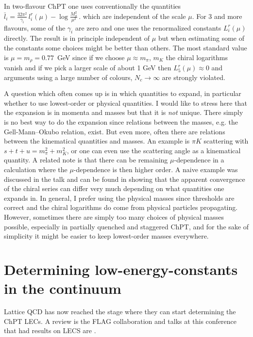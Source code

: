 \documentclass[cits,hyper]{PoS}
\begin{document}
In two-flavour ChPT \cite{GL1} one uses
conventionally the quantities
$\bar l_i = \frac{32\pi^2}{\gamma_i}\, l_i^r(\mu)-\log\frac{M_\pi^2}{\mu^2}\,.
$ which are independent of the scale $\mu$.
For 3 and more flavours, some of the $\gamma_i$ are zero
and one uses the renormalized constants $L_i^r({\mu})$ directly.
The result is in principle independent of $\mu$ but when estimating some of the
constants some choices might be better than others.
The most standard value is $\mu = m_\rho=0.77$~GeV since if we choose
$\mu\approx m_\pi$, $m_K$ the chiral logarithms vanish and if we pick
a larger scale of about 
1 GeV then $L_5^r(\mu)\approx0$ and arguments using a large number of colours,
$N_c\to\infty$ are strongly violated.

A question which often comes up is in which quantities to expand, in
particular whether to use lowest-order or physical quantities. I would like
to stress here that the expansion is in momenta and masses but that it is
\emph{not} unique. There simply is no best way to do the expansion
since relations between the masses, e.g. the Gell-Mann--Okubo relation, exist.
But even more, often there are relations between the kinematical quantities
and masses. An example is $\pi K$ scattering with
$s+t+u=m_\pi^2+m_K^2$, or one can even use the scattering angle as a
kinematical quantity. A related note is that there can be remaining
$\mu$-dependence in a calculation where the $\mu$-dependence is then higher
order. A naive example was discussed in the talk and can be found
in \cite{latticetalk} showing that the apparent convergence of the chiral
series can differ very much depending on what quantities one expands in.
In general, I prefer using the physical masses since thresholds are correct
and the chiral logarithms do come from physical particles propagating.
However, sometimes there are simply too many choices of physical masses
possible, especially in partially quenched and staggered ChPT, and for
the sake of simplicity it might be easier to keep lowest-order masses
everywhere.

\section{Determining low-energy-constants in the continuum}

Lattice QCD has now reached the stage where they can start determining
the ChPT LECs. A review is the FLAG collaboration \cite{FLAG} and
talks at this conference that had results on LECS are \cite{Lellouch,Stolz,
Deuzeman,Bernard}.
\end{document}
